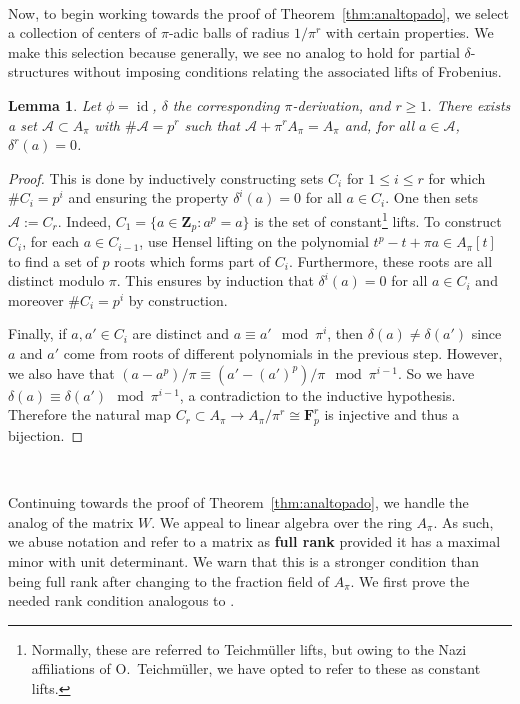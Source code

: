 \documentclass[10pt]{amsart}
\theoremstyle{Theorem}
\newtheorem{lem}[thm]{Lemma}
\theoremstyle{definition}
\newcommand{\FF}{\mathbf F}
\newcommand{\ZZ}{\mathbf Z}
\newcommand{\id}{\operatorname{id}}
\newcommand{\cA}{\mathcal{A}}
\renewcommand{\d}{\delta}
\begin{document}
\


Now, to begin working towards the proof of Theorem~\ref{thm:analtopado}, we select a collection of centers of $\pi$-adic balls of radius $1/\pi^r$ with certain properties. We make this selection because generally, we see no analog \cite[Lem. 11]{BRS11} to hold for partial $\d$-structures without imposing conditions relating the associated lifts of Frobenius. 

\begin{lem}\label{lem:ODE} Let $\phi = \id$, $\delta$ the corresponding $\pi$-derivation, and $r\geq 1$.  There exists a set $\cA\subset A_\pi$ with $\#\cA = p^r$ such that $\cA + \pi^rA_\pi = A_\pi$ and, for all $a\in \cA$, $\delta^r(a) = 0$.
\end{lem}
\begin{proof} This is done by inductively constructing sets $C_i$ for $1 \leq i \leq r$ for which $\# C_i = p^i$ and ensuring the property $\d^i(a) = 0$ for all $a \in C_i$. One then sets $\cA := C_r$. Indeed, $C_1 = \{ a \in \ZZ_p \colon a^p = a\}$ is the set of constant\footnote{Normally, these are referred to Teichm\"uller lifts, but owing to the Nazi affiliations of O.\ Teichm\"uller, we have opted to refer to these as constant lifts.} lifts. To construct $C_i$, for each $a \in C_{i-1}$, use Hensel lifting on the polynomial $t^p - t + \pi a \in A_\pi[t]$ to find a set of $p$ roots which forms part of $C_i$. Furthermore, these roots are all distinct modulo $\pi$.  This ensures by induction that $\d^i(a) = 0$ for all $a \in C_i$ and moreover $\# C_i = p^i$ by construction. 

Finally, if $a, a'\in C_i$ are distinct and $a \equiv a' \mod \pi^i$, then $\delta(a)\neq \delta(a')$ since $a$ and $a'$ come from roots of different polynomials in the previous step.  However, we also have that $(a - a^p)/\pi\equiv (a'-(a')^p)/\pi \mod \pi^{i-1}$. So we have $\delta(a)\equiv \delta(a') \mod \pi^{i-1}$, a contradiction to the inductive hypothesis.  Therefore the natural map $C_r \subset A_\pi \to A_\pi/ \pi^r \cong \FF_p^r$ is injective and thus a bijection. 
\end{proof}

\

Continuing towards the proof of Theorem~\ref{thm:analtopado}, we handle the analog of the matrix $W$. We appeal to linear algebra over the ring $A_\pi$. As such, we abuse notation and refer to a matrix as {\bf full rank} provided it has a maximal minor with unit determinant. We warn that this is a stronger condition than being full rank after changing to the fraction field of $A_\pi$. We first prove the needed rank condition analogous to \cite[Lem. 12]{BRS11}. 
\end{document}
